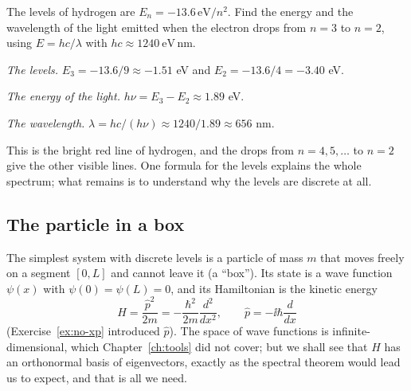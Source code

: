 \begin{example}\label{ex:hydrogen-line}
  The levels of hydrogen are $E_n=-13.6\,\mathrm{eV}/n^2$. Find the energy and the wavelength of the light emitted when the electron drops from $n=3$ to $n=2$, using $E=hc/\lambda$ with $hc\approx1240\ \mathrm{eV\,nm}$.
\end{example}
\begin{solution}
  \begin{steps}
    \item \emph{The levels.} $E_3=-13.6/9\approx-1.51$ eV and $E_2=-13.6/4=-3.40$ eV.
    \item \emph{The energy of the light.} $h\nu=E_3-E_2\approx1.89$ eV.
    \item \emph{The wavelength.} $\lambda=hc/(h\nu)\approx1240/1.89\approx656$ nm.
  \end{steps}
  This is the bright red line of hydrogen, and the drops from $n=4,5,\dots$ to $n=2$ give the other visible lines. One formula for the levels explains the whole spectrum; what remains is to understand why the levels are discrete at all.
\end{solution}

\subsection{The particle in a box}

The simplest system with discrete levels is a particle of mass $m$ that moves freely on a segment $[0,L]$ and cannot leave it (a ``box''). Its state is a wave function $\psi(x)$ with $\psi(0)=\psi(L)=0$, and its Hamiltonian is the kinetic energy
\[
  H=\frac{\hat p^2}{2m}=-\frac{\hbar^2}{2m}\frac{d^2}{dx^2},\qquad\hat p=-\ii\hbar\frac{d}{dx}
\]
(Exercise~\ref{ex:no-xp} introduced $\hat p$). The space of wave functions is infinite-dimensional, which Chapter~\ref{ch:tools} did not cover; but we shall see that $H$ has an orthonormal basis of eigenvectors, exactly as the spectral theorem would lead us to expect, and that is all we need.

